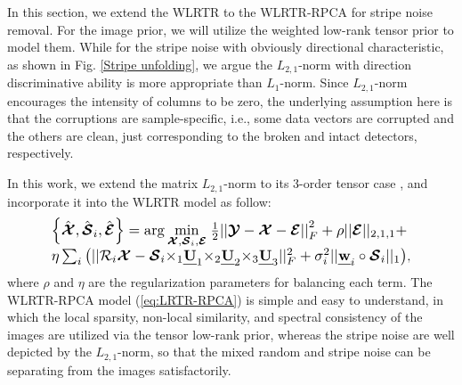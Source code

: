 \documentclass[twocolumn]{svjour3}          %
\begin{document}
    In this section, we extend the WLRTR to the WLRTR-RPCA for stripe noise removal. For the image prior, we will utilize the weighted low-rank tensor prior to model them. While for the stripe noise with obviously directional characteristic, as shown in Fig. \ref{Stripe unfolding}, we argue the ${{{L}}_{2,1}}$-norm with direction discriminative ability is more appropriate than ${{{L}}_{1}}$-norm. Since ${{{L}}_{2,1}}$-norm  encourages the intensity of columns to be zero, the underlying assumption here is that the corruptions are sample-specific, i.e., some data vectors are corrupted and the others are clean, just corresponding to the broken and intact detectors, respectively.

    In this work, we extend the matrix ${{{L}}_{2,1}}$-norm to its 3-order tensor case , and incorporate it into the WLRTR model as follow:
    \begin{equation}\label{eq:LRTR-RPCA}
    \begin{aligned}
    \begin{array}{l}
    \setlength{\abovedisplayskip}{2pt}
    \setlength{\belowdisplayskip}{2pt}
    \resizebox{0.83\hsize}{!}{$\left\{ {\hat{\boldsymbol{\mathcal{X}}},{{\hat{\boldsymbol{\mathcal{S}}}}_i},\hat{\boldsymbol{\mathcal{E}}}} \right\} = \arg \mathop {\min }\limits_{{\boldsymbol{\mathcal{X}}},{{\boldsymbol{\mathcal{S}}}_i},{\boldsymbol{\mathcal{E}}}} {\kern 1pt} \frac{1}{2}{\rm{||}}{\boldsymbol{\mathcal{Y}}} - {\boldsymbol{\mathcal{X}}} - {\boldsymbol{\mathcal{E}}}{\rm{||}}_F^2 + \rho ||{\boldsymbol{\mathcal{E}}}|{|_{2,1,1}}+$}\\
    \resizebox{0.83\hsize}{!}{$\eta \sum\nolimits_i {\left( {||{{\cal R}_i}{\boldsymbol{\mathcal{X}}} - {{\boldsymbol{\mathcal{S}}}_i}{ \times _1}{\textbf{\emph{U}}_1}{ \times _2}{\textbf{\emph{U}}_2}{ \times _3}{\textbf{\emph{U}}_3}||_F^2 + \sigma _i^2||{\textbf{\emph{w}}_i} \circ {{\boldsymbol{\mathcal{S}}}_i}|{|_1}} \right)}$} ,
    \end{array}
    \end{aligned}
    \end{equation}
    where $\rho$ and $\eta$ are the regularization parameters for balancing each term. The WLRTR-RPCA model (\ref{eq:LRTR-RPCA}) is simple and easy to understand, in which the local sparsity, non-local similarity, and spectral consistency of the images are utilized via the tensor low-rank prior, whereas the stripe noise are well depicted by the ${{{L}}_{2,1}}$-norm, so that the mixed random and stripe noise can be separating from the images satisfactorily.
\end{document}
